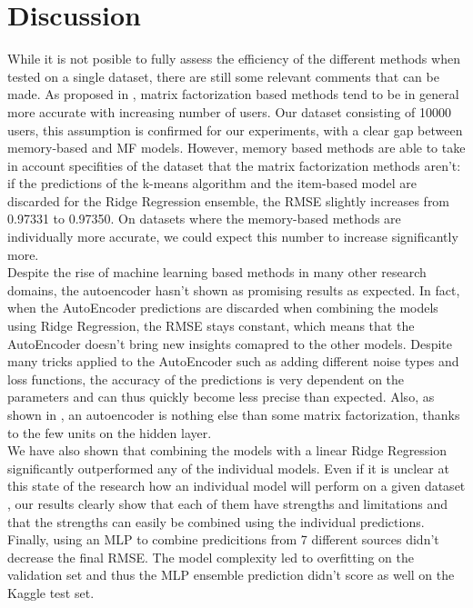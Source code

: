 \documentclass[10pt,conference,compsocconf]{IEEEtran}
\begin{document}
\section{Discussion}
\label{disc}

While it is not posible to fully assess the efficiency of the different methods when tested on a single dataset, there are still some relevant comments that can be made. 
As proposed in \cite{comparative}, matrix factorization based methods tend to be in general more accurate with increasing number of users. Our dataset consisting of 10000 users, this assumption is confirmed for our experiments, with a clear gap between memory-based and MF models. However, memory based methods are able to take in account specifities of the dataset that the matrix factorization methods aren't: if the predictions of the k-means algorithm and the item-based model are discarded for the Ridge Regression ensemble, the RMSE slightly increases from 0.97331 to 0.97350. On datasets where the memory-based methods are individually more accurate, we could expect this number to increase significantly more.\\
Despite the rise of machine learning based methods in many other research domains, the autoencoder hasn't shown as promising results as expected. In fact, when the AutoEncoder predictions are discarded when combining the models using Ridge Regression, the RMSE stays constant, which means that the AutoEncoder doesn't bring new insights comapred to the other models. Despite many tricks applied to the AutoEncoder such as adding different noise types and loss functions, the accuracy of the predictions is very dependent on the parameters and can thus quickly become less precise than expected. Also, as shown in \cite{Kuchaiev2017TrainingDA}, an autoencoder is nothing else than some matrix factorization, thanks to the few units on the hidden layer.\\
We have also shown that combining the models with a linear Ridge Regression significantly outperformed any of the individual models. Even if it is unclear at this state of the research how an individual model will perform on a given dataset \cite{comparative}, our results clearly show that each of them have strengths and limitations and that the strengths can easily be combined using the individual predictions. Finally, using an MLP to combine predicitions from 7 different sources didn't decrease the final RMSE. The model complexity led to overfitting on the validation set and thus the MLP ensemble prediction didn't score as well on the Kaggle test set.
\end{document}

